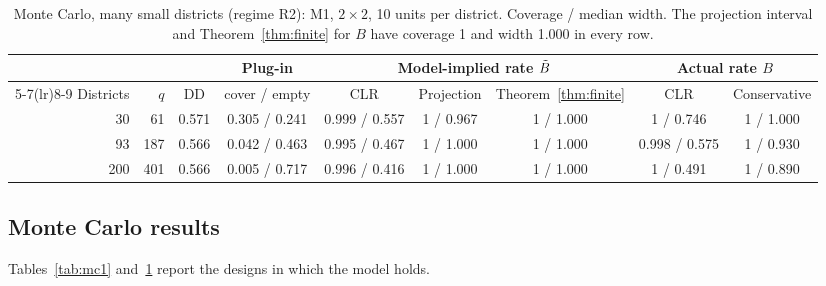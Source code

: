 \begin{table}[t]
\centering\footnotesize
\setlength{\tabcolsep}{4pt}
\begin{tabular}{@{}rrccccccc@{}}
\toprule
& & & Plug-in & \multicolumn{3}{c}{Model-implied rate $\tilde B$} & \multicolumn{2}{c}{Actual rate $B$} \\
\cmidrule(lr){5-7}\cmidrule(lr){8-9}
Districts & $q$ & DD & cover / empty & CLR & Projection & Theorem~\ref{thm:finite} & CLR & Conservative \\
\midrule
30 & 61 & 0.571 & 0.305 / 0.241 & 0.999 / 0.557 & 1 / 0.967 & 1 / 1.000 & 1 / 0.746 & 1 / 1.000 \\
93 & 187 & 0.566 & 0.042 / 0.463 & 0.995 / 0.467 & 1 / 1.000 & 1 / 1.000 & 0.998 / 0.575 & 1 / 0.930 \\
200 & 401 & 0.566 & 0.005 / 0.717 & 0.996 / 0.416 & 1 / 1.000 & 1 / 1.000 & 1 / 0.491 & 1 / 0.890 \\
\bottomrule
\end{tabular}
\caption{Monte Carlo, many small districts (regime R2): M1, $2\times2$, 10 units per district. Coverage / median width. The projection interval and Theorem~\ref{thm:finite} for $B$ have coverage 1 and width 1.000 in every row.}\label{tab:mc2}
\end{table}

\subsection{Monte Carlo results}

Tables~\ref{tab:mc1} and~\ref{tab:mc2} report the designs in which the model holds.

